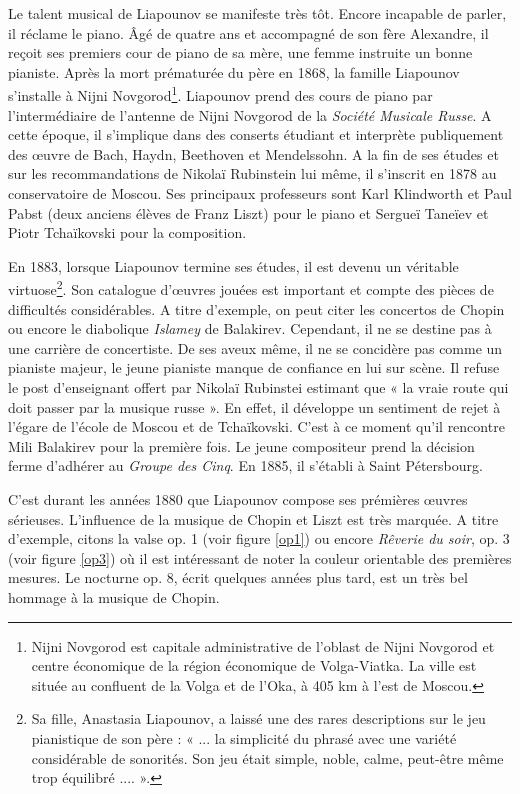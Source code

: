 Le talent musical de Liapounov se manifeste très tôt. Encore incapable de parler, il réclame le piano. Âgé de quatre ans et accompagné de son fère Alexandre, il reçoit ses premiers cour de piano de sa mère, une femme instruite un bonne pianiste. Après la mort prématurée du père en 1868, la famille Liapounov s'installe à Nijni Novgorod\footnote{Nijni Novgorod est capitale administrative de l'oblast de Nijni Novgorod et centre économique de la région économique de Volga-Viatka. La ville est située au confluent de la Volga et de l'Oka, à 405 km à l'est de Moscou.}. Liapounov prend des cours de piano par l'intermédiaire de l'antenne de Nijni Novgorod de la \emph{Société Musicale Russe}. A cette époque, il s'implique dans des conserts étudiant et interprète publiquement des œuvre de Bach, Haydn, Beethoven et Mendelssohn. A la fin de ses études et sur les recommandations de Nikolaï Rubinstein lui même, il s'inscrit en 1878 au conservatoire de Moscou. Ses principaux professeurs sont Karl Klindworth et Paul Pabst (deux anciens élèves de Franz Liszt) pour le piano et Sergueï Taneïev et Piotr Tchaïkovski pour la composition.

En 1883, lorsque Liapounov termine ses études, il est devenu un véritable virtuose\footnote{Sa fille, Anastasia Liapounov, a laissé une des rares descriptions sur le jeu pianistique de son père : « ... la simplicité du phrasé avec une variété considérable de sonorités. Son jeu était simple, noble, calme, peut-être même trop équilibré .... ».}. Son catalogue d'œuvres jouées est important et compte des pièces de difficultés considérables. A titre d'exemple, on peut citer les concertos de Chopin ou encore le diabolique \emph{Islamey} de Balakirev. Cependant, il ne se destine pas à une carrière de concertiste. De ses aveux même, il ne se concidère pas comme un pianiste majeur, le jeune pianiste manque de confiance en lui sur scène. Il refuse le post d'enseignant offert par Nikolaï Rubinstei estimant que « la vraie route qui doit passer par la musique russe ». En effet, il développe un sentiment de rejet à l'égare de l'école de Moscou et de Tchaïkovski. C'est à ce moment qu'il rencontre Mili Balakirev pour la première fois. Le jeune compositeur prend la décision ferme d'adhérer au \emph{Groupe des Cinq}. En 1885, il s'établi à Saint Pétersbourg.

C'est durant les années 1880 que Liapounov compose ses prémières œuvres sérieuses. L'influence de la musique de Chopin et Liszt est très marquée. A titre d'exemple, citons la valse op. 1 (voir figure \ref{op1}) ou encore \emph{Rêverie du soir}, op. 3 (voir figure \ref{op3}) où il est intéressant de noter la couleur orientable des premières mesures. Le nocturne op. 8, écrit quelques années plus tard, est un très bel hommage à la musique de Chopin.

